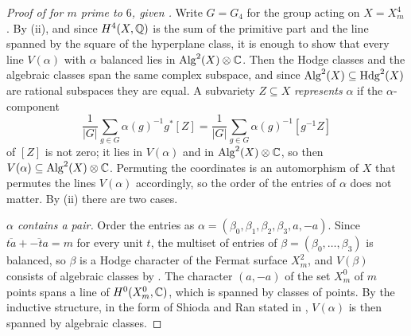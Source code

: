 \begin{proof}[Proof of  for $m$ prime to $6$, given ]
Write $G=G_{4}$ for the group acting on $X=X^{4}_{m}$. By
(ii), and since $H^{4}(X,\mathbb{Q})$ is the sum of the
primitive part and the line spanned by the square of the hyperplane class,
it is enough to show that every line $V(\alpha)$ with $\alpha$ balanced lies
in $\operatorname{Alg}^{2}(X)\otimes\mathbb{C}$. Then the Hodge classes and the
algebraic classes span the same complex subspace, and since
$\operatorname{Alg}^{2}(X)\subseteq\operatorname{Hdg}^{2}(X)$ are rational subspaces they are equal. A
subvariety $Z\subseteq X$ \emph{represents} $\alpha$ \cite{Aok87} if the
$\alpha$-component
\[
  \frac{1}{|G|}\sum_{g\in G}\alpha(g)^{-1}g^{*}[Z]=\frac{1}{|G|}\sum_{g\in
  G}\alpha(g)^{-1}[g^{-1}Z]
\]
of $[Z]$ is not zero; it lies in $V(\alpha)$ and in
$\operatorname{Alg}^{2}(X)\otimes\mathbb{C}$, so then $V(\alpha)\subseteq\operatorname{Alg}^{2}(X)\otimes\mathbb{C}$.
Permuting the coordinates is an automorphism of $X$ that permutes the lines
$V(\alpha)$ accordingly, so the order of the entries of $\alpha$ does not
matter. By (ii) there are two cases.

\emph{$\alpha$ contains a pair.} Order the entries as
$\alpha=(\beta_{0},\beta_{1},\beta_{2},\beta_{3},a,-a)$. Since
$\overline{ta}+\overline{-ta}=m$ for every unit $t$, the multiset of entries of
$\beta=(\beta_{0},\dots,\beta_{3})$ is balanced, so $\beta$ is a
Hodge character of the Fermat surface $X^{2}_{m}$, and $V(\beta)$ consists of
algebraic classes by . The character $(a,-a)$ of the set
$X^{0}_{m}$ of $m$ points spans a line of $H^{0}(X^{0}_{m},\mathbb{C})$, which is
spanned by classes of points. By the inductive structure, in the form of
Shioda and Ran stated in \cite[Theorem~1-4(i)]{Aok87}, $V(\alpha)$ is then
spanned by algebraic classes.


\end{proof}
